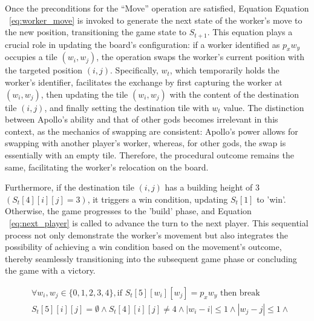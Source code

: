 \documentclass{telkomnika}
\begin{document}
Once the preconditions for the ``Move'' operation are satisfied, Equation Equation ~\ref{eq:worker_move} is invoked to generate the next state of the worker's move to the new position, transitioning the game state to \( S_{t+1} \). This equation plays a crucial role in updating the board's configuration: if a worker identified as \( p_xw_y \) occupies a tile \( (w_i, w_j) \), the operation swaps the worker's current position with the targeted position \( (i, j) \). Specifically, \( w_t \), which temporarily holds the worker's identifier, facilitates the exchange by first capturing the worker at \( (w_i, w_j) \), then updating the tile \( (w_i, w_j) \) with the content of the destination tile \( (i, j) \), and finally setting the destination tile with \( w_t \) value. The distinction between Apollo's ability and that of other gods becomes irrelevant in this context, as the mechanics of swapping are consistent: Apollo's power allows for swapping with another player's worker, whereas, for other gods, the swap is essentially with an empty tile. Therefore, the procedural outcome remains the same, facilitating the worker's relocation on the board.

Furthermore, if the destination tile \( (i, j) \) has a building height of 3 \( (S_t[4][i][j] = 3) \), it triggers a win condition, updating \( S_t[1] \) to 'win'. Otherwise, the game progresses to the 'build' phase, and Equation ~\ref{eq:next_player} is called to advance the turn to the next player. This sequential process not only demonstrate the worker's movement but also integrates the possibility of achieving a win condition based on the movement's outcome, thereby seamlessly transitioning into the subsequent game phase or concluding the game with a victory.

    
\begin{equation}
 \begin{aligned}
    &\forall w_i, w_j \in \{0,1,2,3,4\},\text{if } S_t[5][w_i][w_j] = p_x w_y \text{ then break}\\
    &S_t[5][i][j]=\emptyset \land S_t[4][i][j]\neq 4 \land |w_i-i|\leq 1 \land |w_j-j| \leq 1 \land\\
 \end{aligned}
\label{eq:chk_worker_build}
\end{equation}
\end{document}
